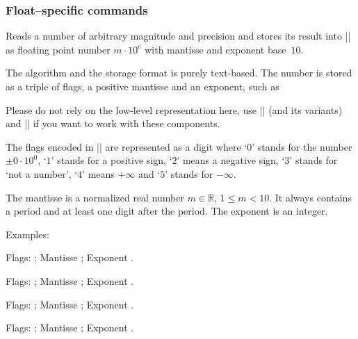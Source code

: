 \subsubsection{Float--specific commands}
\begin{command}{\pgfmathfloatparsenumber{}}
	Reads a number of arbitrary magnitude and precision and stores its result into |\pgfmathresult| as floating point number $m \cdot 10^e$ with mantisse and exponent base~$10$.

	The algorithm and the storage format is purely text-based. The number is stored as a triple of flags, a positive mantisse and an exponent, such as
\begin{codeexample}[]
\pgfmathresult
\end{codeexample}
	Please do not rely on the low-level representation here, use |\pgfmathfloattomacro| (and its variants) and |\pgfmathfloatcreate| if you want to work with these components.

	The flags encoded in |\pgfmathresult| are represented as a digit where `$0$' stands for the number $\pm 0\cdot 10^0$, `$1$' stands for a positive sign, `$2$' means a negative sign, `$3$' stands for `not a number', `$4$' means $+\infty$ and `$5$' stands for $-\infty$.

	The mantisse is a normalized real number $m \in \mathbb{R}$, $1 \le m < 10$. It always contains a period and at least one digit after the period. The exponent is an integer.

	Examples:
\begin{codeexample}[]
\pgfmathfloattomacro{\pgfmathresult}{\F}{\M}{\E}
Flags: \F; Mantisse \M; Exponent \E.
\end{codeexample}

\begin{codeexample}[]
\pgfmathfloattomacro{\pgfmathresult}{\F}{\M}{\E}
Flags: \F; Mantisse \M; Exponent \E.
\end{codeexample}

\begin{codeexample}[]
\pgfmathfloattomacro{\pgfmathresult}{\F}{\M}{\E}
Flags: \F; Mantisse \M; Exponent \E.
\end{codeexample}

\begin{codeexample}[]
\pgfmathfloattomacro{\pgfmathresult}{\F}{\M}{\E}
Flags: \F; Mantisse \M; Exponent \E.
\end{codeexample}


\end{command}
